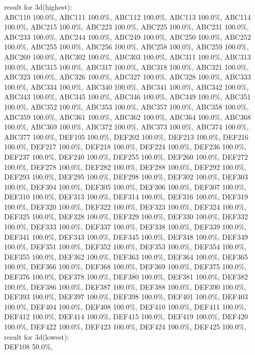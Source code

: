 result for 3d(highest):\\
 ABC110 100.0\%, 
 ABC111 100.0\%, 
 ABC112 100.0\%, 
 ABC113 100.0\%, 
 ABC114 100.0\%, 
 ABC215 100.0\%, 
 ABC223 100.0\%, 
 ABC225 100.0\%, 
 ABC231 100.0\%, 
 ABC233 100.0\%, 
 ABC244 100.0\%, 
 ABC249 100.0\%, 
 ABC250 100.0\%, 
 ABC252 100.0\%, 
 ABC255 100.0\%, 
 ABC256 100.0\%, 
 ABC258 100.0\%, 
 ABC259 100.0\%, 
 ABC260 100.0\%, 
 ABC302 100.0\%, 
 ABC303 100.0\%, 
 ABC311 100.0\%, 
 ABC313 100.0\%, 
 ABC315 100.0\%, 
 ABC317 100.0\%, 
 ABC318 100.0\%, 
 ABC321 100.0\%, 
 ABC323 100.0\%, 
 ABC326 100.0\%, 
 ABC327 100.0\%, 
 ABC328 100.0\%, 
 ABC333 100.0\%, 
 ABC334 100.0\%, 
 ABC340 100.0\%, 
 ABC341 100.0\%, 
 ABC342 100.0\%, 
 ABC343 100.0\%, 
 ABC345 100.0\%, 
 ABC346 100.0\%, 
 ABC349 100.0\%, 
 ABC351 100.0\%, 
 ABC352 100.0\%, 
 ABC353 100.0\%, 
 ABC357 100.0\%, 
 ABC358 100.0\%, 
 ABC359 100.0\%, 
 ABC361 100.0\%, 
 ABC362 100.0\%, 
 ABC364 100.0\%, 
 ABC368 100.0\%, 
 ABC369 100.0\%, 
 ABC372 100.0\%, 
 ABC373 100.0\%, 
 ABC374 100.0\%, 
 ABC377 100.0\%, 
 DEF105 100.0\%, 
 DEF202 100.0\%, 
 DEF213 100.0\%, 
 DEF216 100.0\%, 
 DEF217 100.0\%, 
 DEF218 100.0\%, 
 DEF224 100.0\%, 
 DEF236 100.0\%, 
 DEF237 100.0\%, 
 DEF240 100.0\%, 
 DEF255 100.0\%, 
 DEF260 100.0\%, 
 DEF272 100.0\%, 
 DEF278 100.0\%, 
 DEF282 100.0\%, 
 DEF288 100.0\%, 
 DEF292 100.0\%, 
 DEF293 100.0\%, 
 DEF295 100.0\%, 
 DEF298 100.0\%, 
 DEF302 100.0\%, 
 DEF303 100.0\%, 
 DEF304 100.0\%, 
 DEF305 100.0\%, 
 DEF306 100.0\%, 
 DEF307 100.0\%, 
 DEF310 100.0\%, 
 DEF313 100.0\%, 
 DEF314 100.0\%, 
 DEF316 100.0\%, 
 DEF319 100.0\%, 
 DEF320 100.0\%, 
 DEF322 100.0\%, 
 DEF323 100.0\%, 
 DEF324 100.0\%, 
 DEF325 100.0\%, 
 DEF328 100.0\%, 
 DEF329 100.0\%, 
 DEF330 100.0\%, 
 DEF332 100.0\%, 
 DEF333 100.0\%, 
 DEF337 100.0\%, 
 DEF338 100.0\%, 
 DEF339 100.0\%, 
 DEF341 100.0\%, 
 DEF343 100.0\%, 
 DEF345 100.0\%, 
 DEF348 100.0\%, 
 DEF349 100.0\%, 
 DEF351 100.0\%, 
 DEF352 100.0\%, 
 DEF353 100.0\%, 
 DEF354 100.0\%, 
 DEF355 100.0\%, 
 DEF362 100.0\%, 
 DEF363 100.0\%, 
 DEF364 100.0\%, 
 DEF365 100.0\%, 
 DEF366 100.0\%, 
 DEF368 100.0\%, 
 DEF369 100.0\%, 
 DEF375 100.0\%, 
 DEF376 100.0\%, 
 DEF378 100.0\%, 
 DEF380 100.0\%, 
 DEF381 100.0\%, 
 DEF382 100.0\%, 
 DEF386 100.0\%, 
 DEF387 100.0\%, 
 DEF388 100.0\%, 
 DEF390 100.0\%, 
 DEF393 100.0\%, 
 DEF397 100.0\%, 
 DEF398 100.0\%, 
 DEF401 100.0\%, 
 DEF403 100.0\%, 
 DEF404 100.0\%, 
 DEF408 100.0\%, 
 DEF410 100.0\%, 
 DEF411 100.0\%, 
 DEF412 100.0\%, 
 DEF414 100.0\%, 
 DEF415 100.0\%, 
 DEF419 100.0\%, 
 DEF420 100.0\%, 
 DEF422 100.0\%, 
 DEF423 100.0\%, 
 DEF424 100.0\%, 
 DEF425 100.0\%, \\
result for 3d(lowest):\\
 DEF108 50.0\%, 
